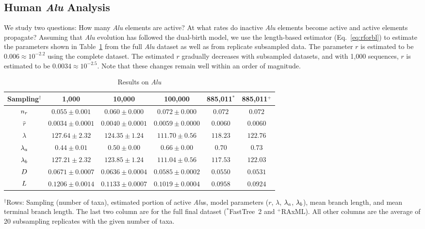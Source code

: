 \subsection{Human \textit{Alu} Analysis}\label{sec:dualbirth-human-alu-analyses}
We study two questions: How many \textit{Alu} elements are active? At what rates do inactive \textit{Alu} elements become active and active elements propagate? Assuming that \textit{Alu} evolution has followed the dual-birth model, we use the length-based estimator (Eq.~\ref{eq:rforbl}) to estimate the parameters shown in Table~\ref{tab:dualbirth-alu} from the full \textit{Alu} dataset as well as from replicate subsampled data. The parameter $r$ is estimated to be $0.006\approx10^{-2.2}$ using the complete dataset. The estimated $r$ gradually decreases with subsampled datasets, and with 1,000 sequences, $r$ is estimated to be $0.0034\approx10^{-2.5}$. Note that these changes remain well within an order of magnitude.

\begin{table}[!ht] %
\caption[Results on \textit{Alu}]{Results on \textit{Alu}}
\vspace{-0.25in}
\begin{center}
\begin{small}
\begin{tabular}{|c|c|c|c|c|c|}
\hline
\textbf{Sampling$^\dagger$} & 1,000 & 10,000 & 100,000 & 885,011$^*$ & 885,011$^+$\\
\hline
$n_r$ & $0.055\pm0.001$ & $0.060\pm0.000$ & $0.072\pm0.000$ & $0.072$ & $0.072$\\
\hline
$\hat{r}$ & $0.0034\pm0.0001$ & $0.0040\pm0.0001$ & $0.0059\pm0.0000$ & $0.0060$ & $0.0060$\\
\hline
$\lambda$ & $127.64\pm2.32$ & $124.35\pm1.24$ & $111.70\pm0.56$ & $118.23$ & $122.76$\\
\hline
$\lambda_a$ & $0.44\pm0.01$ & $0.50\pm0.00$ & $0.66\pm0.00$ & $0.70$ & $0.73$\\
\hline
$\lambda_b$ & $127.21\pm2.32$ & $123.85\pm1.24$ & $111.04\pm0.56$ & $117.53$ & $122.03$\\
\hline
$D$ & $0.0671\pm0.0007$ & $0.0636\pm0.0004$ & $0.0585\pm0.0002$ & $0.0550$ & $0.0531$\\
\hline
$L$ & $0.1206\pm0.0014$ & $0.1133\pm0.0007$ & $0.1019\pm0.0004$ & $0.0958$ & $0.0924$\\
\hline
\end{tabular}
\end{small}
\end{center}
$^\dagger$Rows: Sampling (number of taxa), estimated portion of active \textit{Alu}s, model parameters ($r$, $\lambda$, $\lambda_a$, $\lambda_b$), mean branch length, and mean terminal branch length. The last two column are for the full final dataset ($^*$FastTree~2 and $^+$RAxML). All other columns are the average of 20 subsampling replicates with the given number of taxa.
\label{tab:dualbirth-alu}
\end{table}

